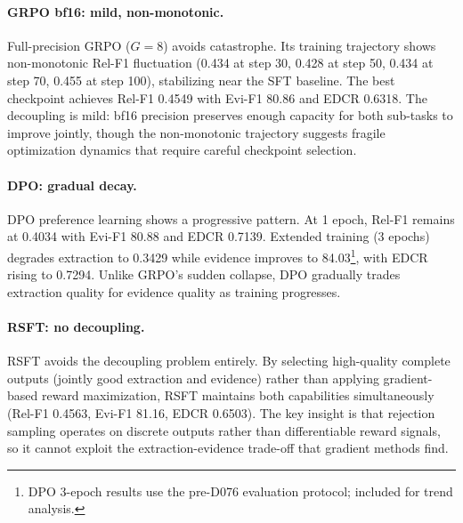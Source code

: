\paragraph{GRPO bf16: mild, non-monotonic.}
Full-precision GRPO ($G{=}8$) avoids catastrophe. Its training trajectory shows non-monotonic Rel-F1 fluctuation (0.434 at step 30, 0.428 at step 50, 0.434 at step 70, 0.455 at step 100), stabilizing near the SFT baseline. The best checkpoint achieves Rel-F1 0.4549 with Evi-F1 80.86 and EDCR 0.6318. The decoupling is mild: bf16 precision preserves enough capacity for both sub-tasks to improve jointly, though the non-monotonic trajectory suggests fragile optimization dynamics that require careful checkpoint selection.

\paragraph{DPO: gradual decay.}
DPO preference learning shows a progressive pattern. At 1 epoch, Rel-F1 remains at 0.4034 with Evi-F1 80.88 and EDCR 0.7139. Extended training (3 epochs) degrades extraction to 0.3429 while evidence improves to 84.03\footnote{DPO 3-epoch results use the pre-D076 evaluation protocol; included for trend analysis.}, with EDCR rising to 0.7294. Unlike GRPO's sudden collapse, DPO gradually trades extraction quality for evidence quality as training progresses.

\paragraph{RSFT: no decoupling.}
RSFT avoids the decoupling problem entirely. By selecting high-quality complete outputs (jointly good extraction and evidence) rather than applying gradient-based reward maximization, RSFT maintains both capabilities simultaneously (Rel-F1 0.4563, Evi-F1 81.16, EDCR 0.6503). The key insight is that rejection sampling operates on discrete outputs rather than differentiable reward signals, so it cannot exploit the extraction-evidence trade-off that gradient methods find.

